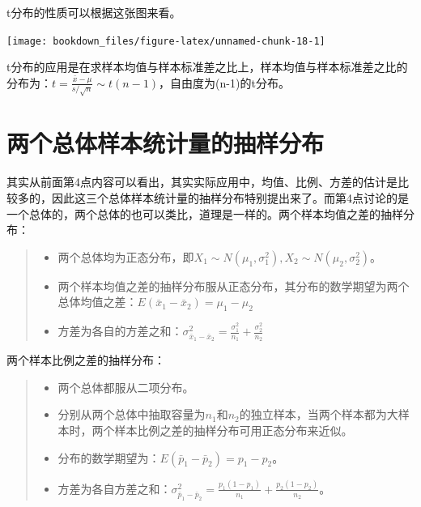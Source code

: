 \documentclass[]{ctexbook}
\providecommand{\tightlist}{%
  \setlength{\itemsep}{0pt}\setlength{\parskip}{0pt}}
\begin{document}
t分布的性质可以根据这张图来看。

\texttt{[image: bookdown\_files/figure-latex/unnamed-chunk-18-1]}

t分布的应用是在求样本均值与样本标准差之比上，样本均值与样本标准差之比的分布为：\(t=\frac{\bar x-\mu}{s/\sqrt{n}}\sim t(n-1)\)，自由度为(n-1)的t分布。

\hypertarget{ux4e24ux4e2aux603bux4f53ux6837ux672cux7edfux8ba1ux91cfux7684ux62bdux6837ux5206ux5e03}{%
\section{两个总体样本统计量的抽样分布}\label{ux4e24ux4e2aux603bux4f53ux6837ux672cux7edfux8ba1ux91cfux7684ux62bdux6837ux5206ux5e03}}

其实从前面第4点内容可以看出，其实实际应用中，均值、比例、方差的估计是比较多的，因此这三个总体样本统计量的抽样分布特别提出来了。而第4点讨论的是一个总体的，两个总体的也可以类比，道理是一样的。两个样本均值之差的抽样分布：

\begin{quote}
\begin{itemize}
\tightlist
\item
  两个总体均为正态分布，即\(X_1\sim N(\mu_1,\sigma_1^2),X_2\sim N(\mu_2,\sigma_2^2)\)。
\item
  两个样本均值之差的抽样分布服从正态分布，其分布的数学期望为两个总体均值之差：\(E(\bar x_1-\bar x_2)=\mu_1-\mu_2\)
\item
  方差为各自的方差之和：\(\sigma_{\bar x_1-\bar x_2}^2=\frac{\sigma_1^2}{n_1}+\frac{\sigma_2^2}{n_2}\)
\end{itemize}
\end{quote}

两个样本比例之差的抽样分布：

\begin{quote}
\begin{itemize}
\tightlist
\item
  两个总体都服从二项分布。
\item
  分别从两个总体中抽取容量为\(n_1\)和\(n_2\)的独立样本，当两个样本都为大样本时，两个样本比例之差的抽样分布可用正态分布来近似。
\item
  分布的数学期望为：\(E(\bar p_1-\bar p_2)=p_1-p_2\)。
\item
  方差为各自方差之和：\(\sigma_{\bar p_1-\bar p_2}^2=\frac{p_1(1-p_1)}{n_1}+\frac{p_2(1-p_2)}{n_2}\)。
\end{itemize}
\end{quote}
\end{document}
